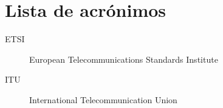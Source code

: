 \chapter*{Lista de acrónimos}

\begin{description}
    \item [ETSI] European Telecommunications Standards Institute
    \item [ITU] International Telecommunication Union
\end{description}